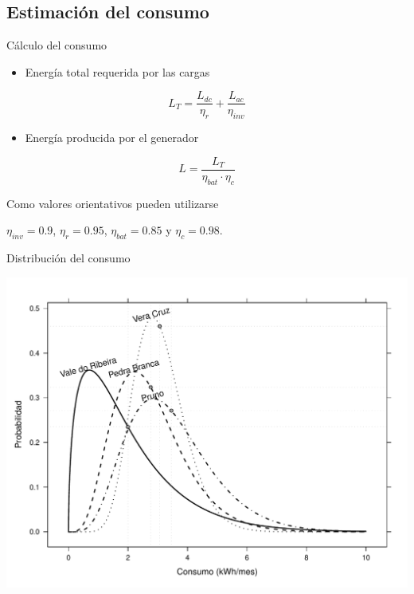\documentclass[xcolor={usenames,svgnames,dvipsnames}]{beamer}
\begin{document}
\subsection{Estimación del consumo}
\label{sec:org86737df}
\begin{frame}[label={sec:org93bb2cb}]{Cálculo del consumo}
\begin{itemize}
\item Energía total requerida por las cargas
\end{itemize}
$$L_{T}=\frac{L_{dc}}{\eta_{r}}+\frac{L_{ac}}{\eta_{inv}}$$

\begin{itemize}
\item Energía producida por el generador
\end{itemize}
$$L=\frac{L_{T}}{\eta_{bat}\cdot\eta_{c}}$$

Como valores orientativos pueden utilizarse

\(\eta_{inv}=0.9\), \(\eta_{r}=0.95\), \(\eta_{bat}=0.85\) y \(\eta_{c}=0.98\).
\end{frame}

\begin{frame}[label={sec:org4362b42}]{Distribución del consumo}
\begin{center}
\includegraphics[width=.9\linewidth]{../figs/ConsumoGamma.pdf}
\end{center}
\end{frame}
\end{document}

